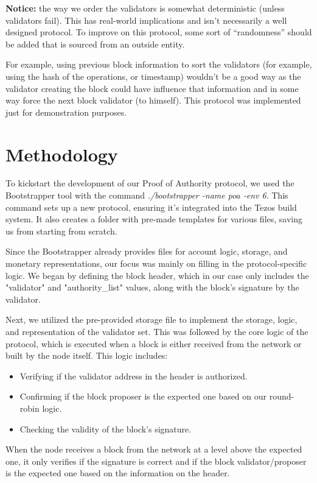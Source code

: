 \textbf{Notice:} the way we order the validators is somewhat deterministic (unless validators fail). This has real-world implications and isn't necessarily a well designed protocol. 
To improve on this protocol, some sort of ``randomness'' should be added that is sourced from an outside entity.

For example, using previous block information to sort the validators (for example, using the hash of the operations, or timestamp) wouldn't be a good way as the validator creating the block could have influence that information and in some way force the next block validator (to himself). This protocol was implemented just for demonstration purposes.

\section{Methodology}

To kickstart the development of our Proof of Authority protocol, we used the Bootstrapper tool with the command \textit{./bootstrapper -name poa -env 6}. This command sets up a new protocol, ensuring it's integrated into the Tezos build system. It also creates a folder with pre-made templates for various files, saving us from starting from scratch.

Since the Bootstrapper already provides files for account logic, storage, and monetary representations, our focus was mainly on filling in the protocol-specific logic. We began by defining the block header, which in our case only includes the "validator" and "authority\_list" values, along with the block's signature by the validator.

Next, we utilized the pre-provided storage file to implement the storage, logic, and representation of the validator set. This was followed by the core logic of the protocol, which is executed when a block is either received from the network or built by the node itself. This logic includes:

\begin{itemize}
    \item Verifying if the validator address in the header is authorized.
    \item Confirming if the block proposer is the expected one based on our round-robin logic.
    \item Checking the validity of the block's signature.
\end{itemize}

When the node receives a block from the network at a level above the expected one, it only verifies if the signature is correct and if the block validator/proposer is the expected one based on the information on the header.


